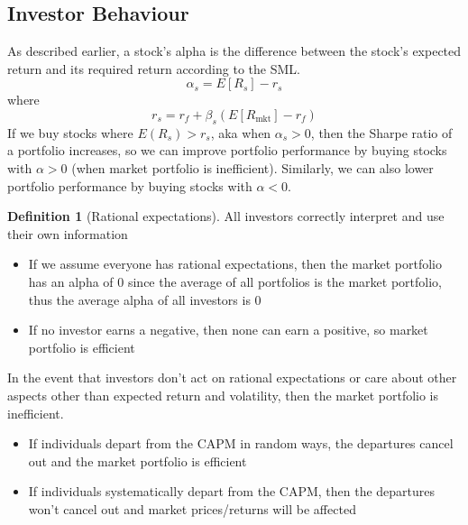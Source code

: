 \documentclass[11pt]{article}
\theoremstyle{definition}
\newtheorem*{definition}{Definition}
\newcommand{\mkt}{\text{mkt}}
\begin{document}
\subsection{Investor Behaviour}
As described earlier, a stock's alpha is the difference between the stock's expected return and its required return according to the SML.
\begin{equation*}
    \alpha_s = E[R_s] - r_s
\end{equation*}
where 
\begin{equation*}
    r_s = r_f + \beta_s(E[R_\mkt] - r_f)
\end{equation*}
If we buy stocks where $E(R_s) > r_s$, aka when $\alpha_s > 0$, then the Sharpe ratio of a portfolio increases, so we can improve portfolio performance by buying stocks with $\alpha > 0$ (when market portfolio is inefficient). Similarly, we can also lower portfolio performance by buying stocks with $\alpha < 0$.
\begin{definition}[Rational expectations]
    All investors correctly interpret and use their own information
\end{definition}
\begin{itemize}
    \item If we assume everyone has rational expectations, then the market portfolio has an alpha of $0$ since the average of all portfolios is the market portfolio, thus the average alpha of all investors is $0$
    \item If no investor earns a negative, then none can earn a positive, so market portfolio is efficient
\end{itemize}
In the event that investors don't act on rational expectations or care about other aspects other than expected return and volatility, then the market portfolio is inefficient.
\begin{itemize}
    \item If individuals depart from the CAPM in random ways, the departures cancel out and the market portfolio is efficient
    \item If individuals systematically depart from the CAPM, then the departures won't cancel out and market prices/returns will be affected
\end{itemize}
\end{document}
